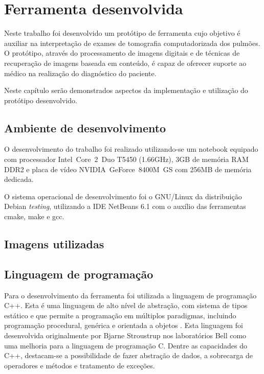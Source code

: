 \chapter{Ferramenta desenvolvida}

Neste trabalho foi desenvolvido um protótipo de ferramenta cujo objetivo é auxiliar na interpretação de exames de tomografia computadorizada dos pulmões. O protótipo, através do processamento de imagens digitais e de técnicas de recuperação de imagens baseada em conteúdo, é capaz de oferecer suporte ao médico na realização do diagnóstico do paciente.

Neste capítulo serão demonstrados aspectos da implementação e utilização do protótipo desenvolvido.

\section{Ambiente de desenvolvimento}

O desenvolvimento do trabalho foi realizado utilizando-se um notebook equipado com processador Intel\textregistered~Core\texttrademark~2~Duo T5450 (1.66GHz), 3GB de memória RAM DDR2 e placa de vídeo NVIDIA\textregistered~GeForce\texttrademark~8400M~GS com 256MB de memória dedicada.

O sistema operacional de desenvolvimento foi o GNU/Linux da distribuição Debian \textit{testing}, utilizando a IDE NetBeans 6.1 com o auxílio das ferramentas cmake, make e gcc.

\section{Imagens utilizadas}



\section{Linguagem de programação}

Para o desenvolvimento da ferramenta foi utilizada a linguagem de programação C++. Esta é uma linguagem de alto nível de abstração, com sistema de tipos estático e que permite a programação em múltiplos paradigmas, incluindo programação procedural, genérica e orientada a objetos \cite{stroustrup2000}. Esta linguagem foi desenvolvida originalmente por Bjarne Stroustrup nos laboratórios Bell como uma melhoria para a linguagem de programação C. Dentre as capacidades do C++, destacam-se a possibilidade de fazer abstração de dados, a sobrecarga de operadores e métodos e tratamento de exceções.

